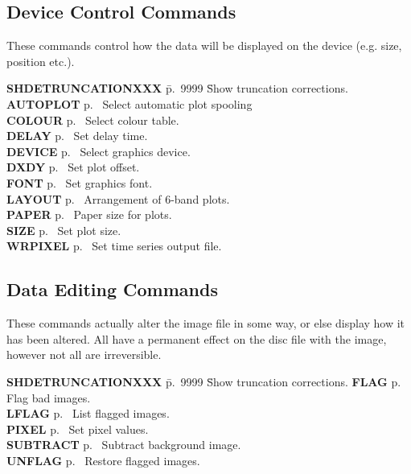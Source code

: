 \subsection{Device Control Commands}

These commands control how the data will be displayed on the device
(e.g. size, position etc.).

\begin{tabbing}
{\bf SHDETRUNCATIONXXX} \= p.~9999 \= Show truncation corrections.\kill
{\bf AUTOPLOT} \> p.~\pageref{au} \> Select automatic plot spooling\\
{\bf COLOUR} \> p.~\pageref{col} \> Select colour table.\\
{\bf DELAY} \> p.~\pageref{del} \> Set delay time.\\
{\bf DEVICE} \> p.~\pageref{dev} \> Select graphics device.\\
{\bf DXDY} \> p.~\pageref{dx} \> Set plot offset.\\
{\bf FONT} \> p.~\pageref{fo} \> Set graphics font.\\
{\bf LAYOUT} \> p.~\pageref{la} \> Arrangement of 6-band plots.\\
{\bf PAPER} \> p.~\pageref{pa} \> Paper size for plots.\\
{\bf SIZE} \> p.~\pageref{siz} \> Set plot size.\\
{\bf WRPIXEL} \> p.~\pageref{wr} \> Set time series output file.\\
\end{tabbing}

\subsection{Data Editing Commands}

These commands actually alter the image file in some way, or else
display how it has been altered. All have a permanent effect on the
disc file with the image, however not all are irreversible.

\begin{tabbing}
{\bf SHDETRUNCATIONXXX} \= p.~9999 \= Show truncation corrections.\kill
{\bf FLAG} \> p.~\pageref{fl} \> Flag bad images.\\
{\bf LFLAG} \> p.~\pageref{lf} \> List flagged images.\\
{\bf PIXEL} \> p.~\pageref{pi} \> Set pixel values.\\
{\bf SUBTRACT} \> p.~\pageref{sub} \> Subtract background image.\\
{\bf UNFLAG} \> p.~\pageref{un} \> Restore flagged images.\\
\end{tabbing}


